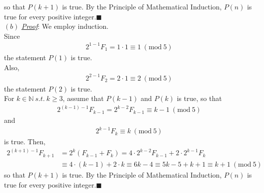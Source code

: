 \documentclass[12pt]{article}
\begin{document}
so that $P(k+1)$ is true. By the Principle of Mathematical Induction, $P(n)$ is true for every positive integer.$\blacksquare$\\[1em]
$(b)$
\underline{\textit{Proof}}: We employ induction.\\[1em]
Since
\begin{gather*}
2^{1-1} F_1 =  1 \cdot 1 \equiv 1 ~(\mathrm{mod}~5)
\end{gather*}
the statement $P(1)$ is true.\\
Also,
\begin{gather*}
2^{2-1} F_2 =  2 \cdot 1 \equiv 2 ~(\mathrm{mod}~5)
\end{gather*}
the statement $P(2)$ is true.\\
For $k \in \mathbb{N} ~s.t.~ k \geq 3$, assume that $P(k-1)$ and $P(k)$ is true, so that
\begin{gather*}
2^{(k-1)-1} F_{k-1} = 2^{k-2} F_{k-1} \equiv k - 1 ~(\mathrm{mod}~5)
\end{gather*}
and 
\begin{gather*}
2^{k-1} F_{k} \equiv k ~(\mathrm{mod}~5)
\end{gather*}
is true. Then,
\begin{align*}
2^{(k+1)-1} F_{k+1} &= 2^{k} \left(F_{k-1} + F_{k}\right) = 4 \cdot 2^{k-2}F_{k-1} + 2 \cdot 2^{k-1}F_{k}\\[1em]
&\equiv 4 \cdot (k-1) + 2 \cdot k \equiv 6k - 4 \equiv 5k - 5 + k + 1 \equiv k + 1 ~(\mathrm{mod}~5)
\end{align*}
so that $P(k+1)$ is true. By the Principle of Mathematical Induction, $P(n)$ is true for every positive integer.$\blacksquare$
\end{document}
